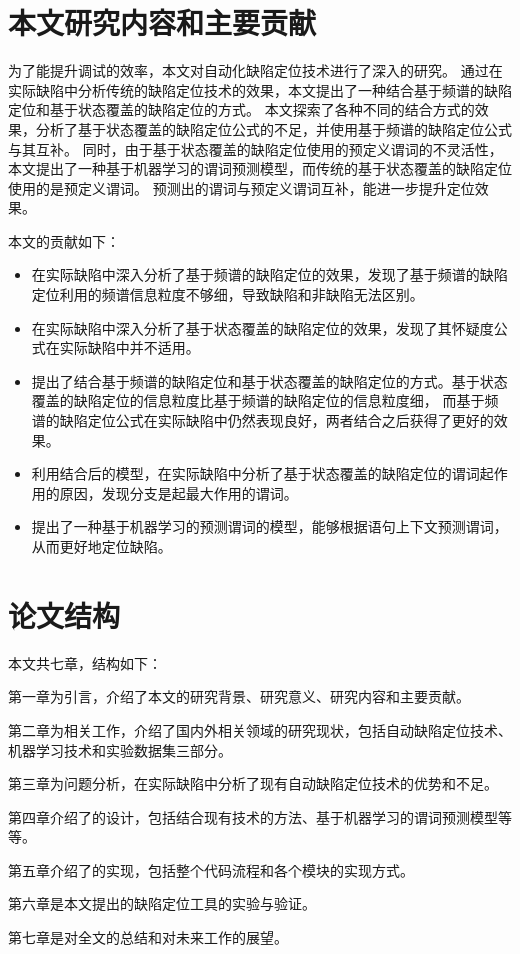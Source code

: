 \section{本文研究内容和主要贡献}

为了能提升调试的效率，本文对自动化缺陷定位技术进行了深入的研究。
通过在实际缺陷中分析传统的缺陷定位技术的效果，本文提出了一种结合基于频谱的缺陷定位和基于状态覆盖的缺陷定位的方式。
本文探索了各种不同的结合方式的效果，分析了基于状态覆盖的缺陷定位公式的不足，并使用基于频谱的缺陷定位公式与其互补。
同时，由于基于状态覆盖的缺陷定位使用的预定义谓词的不灵活性，
本文提出了一种基于机器学习的谓词预测模型，而传统的基于状态覆盖的缺陷定位使用的是预定义谓词。
预测出的谓词与预定义谓词互补，能进一步提升定位效果。

本文的贡献如下：
\begin{itemize}
\item 在实际缺陷中深入分析了基于频谱的缺陷定位的效果，发现了基于频谱的缺陷定位利用的频谱信息粒度不够细，导致缺陷和非缺陷无法区别。
\item 在实际缺陷中深入分析了基于状态覆盖的缺陷定位的效果，发现了其怀疑度公式在实际缺陷中并不适用。
\item 提出了结合基于频谱的缺陷定位和基于状态覆盖的缺陷定位的方式。基于状态覆盖的缺陷定位的信息粒度比基于频谱的缺陷定位的信息粒度细，
而基于频谱的缺陷定位公式在实际缺陷中仍然表现良好，两者结合之后获得了更好的效果。
\item 利用结合后的模型，在实际缺陷中分析了基于状态覆盖的缺陷定位的谓词起作用的原因，发现分支是起最大作用的谓词。
\item 提出了一种基于机器学习的预测谓词的模型，能够根据语句上下文预测谓词，从而更好地定位缺陷。
\end{itemize}

\section{论文结构}

本文共七章，结构如下：

第一章为引言，介绍了本文的研究背景、研究意义、研究内容和主要贡献。

第二章为相关工作，介绍了国内外相关领域的研究现状，包括自动缺陷定位技术、机器学习技术和实验数据集三部分。

第三章为问题分析，在实际缺陷中分析了现有自动缺陷定位技术的优势和不足。

第四章介绍了\toolname{}的设计，包括结合现有技术的方法、基于机器学习的谓词预测模型等等。

第五章介绍了\toolname{}的实现，包括整个代码流程和各个模块的实现方式。

第六章是本文提出的缺陷定位工具的实验与验证。

第七章是对全文的总结和对未来工作的展望。

